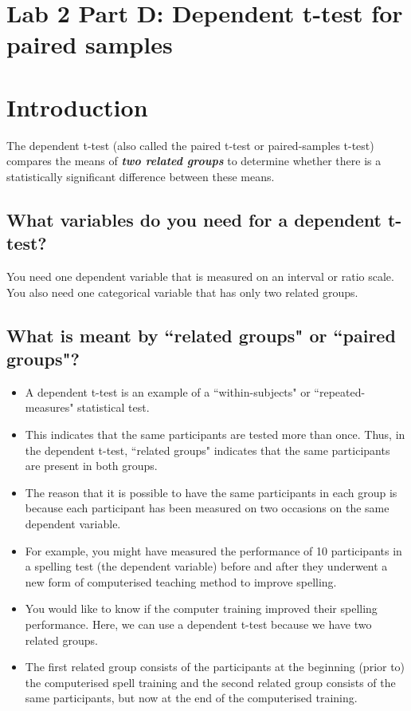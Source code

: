 \documentclass[]{article}
\begin{document}
	
	\section*{Lab 2 Part D: Dependent t-test for paired samples}
	
\section{Introduction}
	The dependent t-test (also called the paired t-test or paired-samples t-test) compares the means of \textbf{\textit{two related groups}} to determine whether there is a statistically significant difference between these means.
	
\subsection{What variables do you need for a dependent t-test?}
	You need one dependent variable that is measured on an interval or ratio scale. You also need one categorical variable that has only two related groups.
	
	\subsection{What is meant by ``related groups" or ``paired groups"?}
\begin{itemize}
\item A dependent t-test is an example of a ``within-subjects" or ``repeated-measures" statistical test. 
\item This indicates that the same participants are tested more than once. Thus, in the dependent t-test, ``related groups" indicates that the same participants are present in both groups. 
\item The reason that it is possible to have the same participants in each group is because each participant has been measured on two occasions on the same dependent variable. 
\item For example, you might have measured the performance of 10 participants in a spelling test (the dependent variable) before and after they underwent a new form of computerised teaching method to improve spelling. 
\item You would like to know if the computer training improved their spelling performance. Here, we can use a dependent t-test because we have two related groups. 
\item The first related group consists of the participants at the beginning (prior to) the computerised spell training and the second related group consists of the same participants, but now at the end of the computerised training.
\end{itemize}
	
\end{document}
